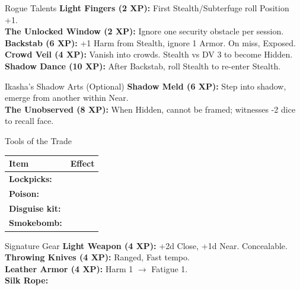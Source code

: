 \documentclass[10pt]{article}
\begin{document}
\begin{minipage}[t]{0.48\linewidth}
    \vspace{0.5em}
    
    \begin{charbox}{Rogue Talents}
        \textbf{Light Fingers (2 XP):} First Stealth/Subterfuge roll Position +1.\\
        \textbf{The Unlocked Window (2 XP):} Ignore one security obstacle per session.\\
        \textbf{Backstab (6 XP):} +1 Harm from Stealth, ignore 1 Armor. On miss, Exposed.\\
        \textbf{Crowd Veil (4 XP):} Vanish into crowds. Stealth vs DV 3 to become Hidden.\\
        \textbf{Shadow Dance (10 XP):} After Backstab, roll Stealth to re-enter Stealth.
    \end{charbox}
\end{minipage}
\hfill
\begin{minipage}[t]{0.48\linewidth}
    \begin{charbox}{Ikasha's Shadow Arts (Optional)}
        \textbf{Shadow Meld (6 XP):} Step into shadow, emerge from another within Near.\\
        \textbf{The Unobserved (8 XP):} When Hidden, cannot be framed; witnesses -2 dice to recall face.
    \end{charbox}
    
    \vspace{0.5em}
    
    \begin{charbox}{Tools of the Trade}
        \begin{tabular}{>{\bfseries}p{3cm} p{4.5cm}}
            \toprule
            \textbf{Item} & \textbf{Effect} \\
            \midrule
            Lockpicks: & \underline{\hspace{4cm}} \\
            Poison: & \underline{\hspace{4cm}} \\
            Disguise kit: & \underline{\hspace{4cm}} \\
            Smokebomb: & \underline{\hspace{4cm}} \\
            \bottomrule
        \end{tabular}
    \end{charbox}
    
    \vspace{0.5em}
    
    \begin{charbox}{Signature Gear}
        \textbf{Light Weapon (4 XP):} +2d Close, +1d Near. Concealable.\\
        \textbf{Throwing Knives (4 XP):} Ranged, Fast tempo.\\
        \textbf{Leather Armor (4 XP):} Harm 1 $\rightarrow$ Fatigue 1.\\
        \textbf{Silk Rope:} \underline{\hspace{4cm}}
    \end{charbox}
\end{minipage}
\end{document}
